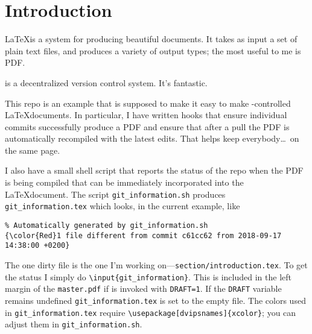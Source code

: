 \section{Introduction}

\LaTeX is a system for producing beautiful documents.
It takes as input a set of plain text files, and produces a variety of output types; the most useful to me is PDF.

\git is a decentralized version control system.
It's fantastic.

This repo\cite{latex-base} is an example that is supposed to make it easy to make \git-controlled \LaTeX documents.
In particular, I have written \git hooks that ensure individual commits successfully produce a PDF and ensure that after a pull the PDF is automatically recompiled with the latest edits.
That helps keep everybody\ldots\ on the same page.

I also have a small shell script that reports the status of the repo when the PDF is being compiled that can be immediately incorporated into the \LaTeX document.
The script \texttt{git\_information.sh} produces \texttt{git\_information.tex} which looks, in the current example, like
\begin{verbatim}
% Automatically generated by git_information.sh
{\color{Red}1 file different from commit c61cc62 from 2018-09-17 14:38:00 +0200}
\end{verbatim}
The one dirty file is the one I'm working on---\texttt{section/introduction.tex}.
To get the \git status I simply do \texttt{\textbackslash{}input\{git\_information\}}.
This is included in the left margin of the \texttt{master.pdf} if \make is invoked with \texttt{DRAFT=1}.
If the \texttt{DRAFT} variable remains undefined \texttt{git\_information.tex} is set to the empty file.
The colors used in \texttt{git\_information.tex} require \texttt{\textbackslash{}usepackage[dvipsnames]\{xcolor\}}; you can adjust them in \texttt{git\_information.sh}.
